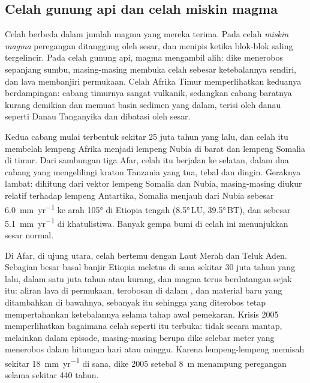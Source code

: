 \subsection*{Celah gunung api dan celah miskin magma}

Celah berbeda dalam jumlah magma yang mereka terima. Pada celah \emph{miskin magma} peregangan ditanggung oleh sesar, dan  menipis ketika blok-blok saling tergelincir. Pada celah gunung api, magma mengambil alih: dike menerobos  sepanjang sumbu, masing-masing membuka celah sebesar ketebalannya sendiri, dan lava membanjiri permukaan. Celah Afrika Timur memperlihatkan keduanya berdampingan: cabang timurnya sangat vulkanik, sedangkan cabang baratnya kurang demikian dan memuat basin sedimen yang dalam, terisi oleh danau seperti Danau Tanganyika dan dibatasi oleh sesar.

Kedua cabang mulai terbentuk sekitar 25 juta tahun yang lalu, dan celah itu membelah lempeng Afrika menjadi lempeng Nubia di barat dan lempeng Somalia di timur. Dari sambungan tiga Afar, celah itu berjalan ke selatan, dalam dua cabang yang mengelilingi kraton Tanzania yang tua, tebal dan dingin. Geraknya lambat: dihitung dari vektor lempeng Somalia dan Nubia, masing-masing diukur relatif terhadap lempeng Antartika, Somalia menjauh dari Nubia sebesar \qty{6.0}{mm.yr^{-1}} ke arah \ang{105} di Etiopia tengah (\ang{8.5}\,LU, \ang{39.5}\,BT), dan sebesar \qty{5.1}{mm.yr^{-1}} di khatulistiwa. Banyak gempa bumi di celah ini menunjukkan sesar normal.

Di Afar, di ujung utara, celah bertemu dengan Laut Merah dan Teluk Aden. Sebagian besar basal banjir Etiopia meletus di sana sekitar 30 juta tahun yang lalu, dalam satu juta tahun atau kurang, dan magma terus berdatangan sejak itu: aliran lava di permukaan, terobosan di dalam , dan material baru yang ditambahkan di bawahnya, sebanyak itu sehingga  yang diterobos tetap mempertahankan ketebalannya selama tahap awal pemekaran. Krisis 2005 memperlihatkan bagaimana celah seperti itu terbuka: tidak secara mantap, melainkan dalam episode, masing-masing berupa dike selebar meter yang menerobos dalam hitungan hari atau minggu. Karena lempeng-lempeng memisah sekitar \qty{18}{mm.yr^{-1}} di sana, dike 2005 setebal \qty{8}{m} menampung peregangan selama sekitar 440 tahun.

